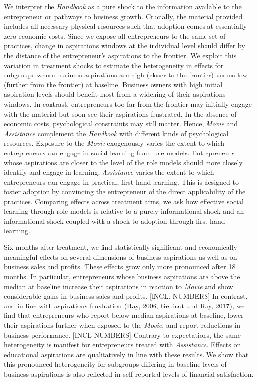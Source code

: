 \documentclass[11.5pt]{article}
\begin{document}
We interpret the \emph{Handbook} as a pure shock to the information available to the entrepreneur on pathways to business growth. Crucially, the material provided includes all necessary physical resources such that adoption comes at essentially zero economic costs. Since we expose all entrepreneurs to the same set of practices, change in aspirations windows at the individual level should differ by the distance of the entrepreneur's aspirations to the frontier. We exploit this variation in treatment shocks to estimate the heterogeneity in effects for subgroups whose business aspirations are high (closer to the frontier) versus low (further from the frontier) at baseline. Business owners with high initial aspiration levels should benefit most from a widening of their aspirations windows. In contrast, entrepreneurs too far from the frontier may initially engage with the material but soon see their aspirations frustrated. In the absence of economic costs, psychological constraints may still matter. Hence, \emph{Movie} and \emph{Assistance} complement the \emph{Handbook} with different kinds of psychological resources. Exposure to the \emph{Movie} exogenously varies the extent to which entrepreneurs can engage in social learning from role models. Entrepreneurs whose aspirations are closer to the level of the role models should more closely identify and engage in learning. \emph{Assistance} varies the extent to which entrepreneurs can engage in practical, first-hand learning. This is designed to foster adoption by convincing the entrepreneur of the direct applicability of the practices. Comparing effects across treatment arms, we ask how effective social learning through role models is relative to a purely informational shock and an informational shock coupled with a shock to adoption through first-hand learning.

Six months after treatment, we find statistically significant and economically meaningful effects on several dimensions of business aspirations as well as on business sales and profits. These effects grow only more pronounced after 18 months. In particular, entrepreneurs whose business aspirations are above the median at baseline increase their aspirations in reaction to \emph{Movie} and show considerable gains in business sales and profits. [INCL. NUMBERS] In contrast, and in line with aspirations frustration (Ray, 2006; Genicot and Ray, 2017), we find that entrepreneurs who report below-median aspirations at baseline, lower their aspirations further when exposed to the \emph{Movie}, and report reductions in business performance. [INCL NUMBERS] Contrary to expectations, the same heterogeneity is manifest for entrepreneurs treated with \emph{Assistance}. Effects on educational aspirations are qualitatively in line with these results. We show that this pronounced heterogeneity for subgroups differing in baseline levels of business aspirations is also reflected in self-reported levels of financial satisfaction.
\end{document}
